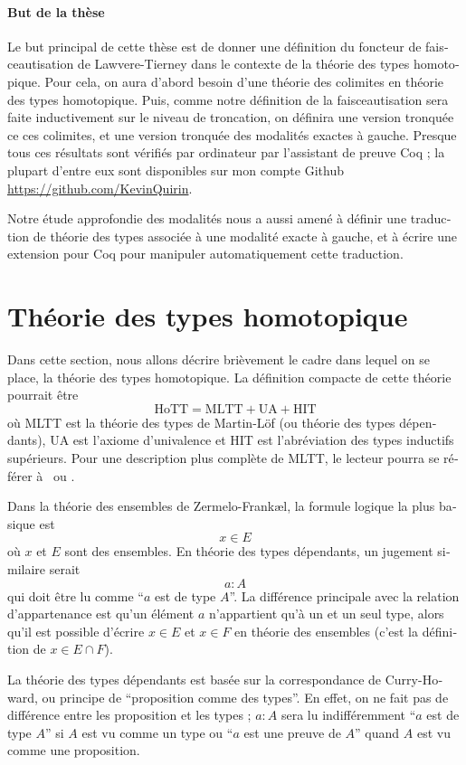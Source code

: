 \begin{otherlanguage}{french}
\paragraph*{But de la thèse}
Le but principal de cette thèse est de donner une définition du
foncteur de faisceautisation de Lawvere-Tierney dans le contexte de la
théorie des types homotopique. Pour cela, on aura d'abord besoin d'une
théorie des colimites en théorie des types homotopique. Puis, comme
notre définition de la faisceautisation sera faite inductivement sur
le niveau de troncation, on définira une version tronquée ce ces
colimites, et une version tronquée des modalités exactes à gauche. 
Presque tous ces résultats sont vérifiés par ordinateur par l'assistant de
preuve Coq ; la plupart d'entre eux sont disponibles sur mon compte
Github \url{https://github.com/KevinQuirin}.

Notre étude approfondie des modalités nous a aussi amené à définir une
traduction de théorie des types associée à une modalité exacte à
gauche, et à écrire une extension pour Coq pour manipuler
automatiquement cette traduction.

\section{Théorie des types homotopique}
Dans cette section, nous allons décrire brièvement le cadre dans
lequel on se place, la théorie des types homotopique. La définition
compacte de cette théorie pourrait être
\[
  \mathrm{HoTT} = \mathrm{MLTT}+\mathrm{UA}+\mathrm{HIT}
\]
où MLTT est la théorie des types de Martin-Löf (ou théorie des types
dépendants), UA est l'axiome
d'univalence et HIT est l'abréviation des types inductifs supérieurs.
Pour une description plus complète de MLTT, le lecteur pourra se référer
à~\cite{hofmann1997syntax} ou \cite{hottbook}.

Dans la théorie des ensembles de Zermelo-Frank\ae l, la formule
logique la plus basique est
\[ x\in E\]
où $x$ et $E$ sont des ensembles. En théorie des types dépendants, un
jugement similaire serait 
\[ a : A\]
qui doit être lu comme ``$a$ est de type $A$''. La différence
principale avec la relation d'appartenance est qu'un élément $a$
n'appartient qu'à un et un seul type, alors qu'il est possible
d'écrire $x\in E$ et $x\in F$ en théorie des ensembles (c'est la
définition de $x\in E\cap F$).

La théorie des types dépendants est basée sur la correspondance de
Curry-Howard, ou principe de ``proposition comme des types''. En
effet, on ne fait pas de différence entre les proposition et les
types ; $a:A$ sera lu indifféremment ``$a$ est de type $A$'' si $A$
est vu comme un type ou ``$a$ est une preuve de $A$'' quand $A$ est vu
comme une proposition. 


\end{otherlanguage}
